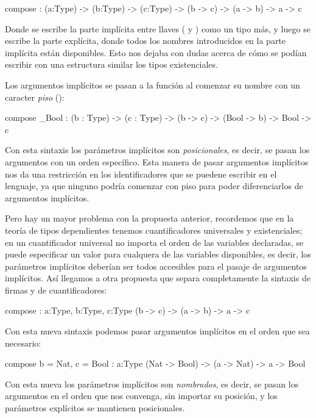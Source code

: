 {\begin{designfr}
\begin{anglercode}
compose : { (a:Type) -> (b:Type) -> (c:Type) } -> (b -> c) -> (a -> b) -> a -> c
\end{anglercode}

Donde se escribe la parte implícita entre llaves (\inlinecode{\{} y \inlinecode{\}}) como un tipo más, y luego se escribe la parte explícita, donde todos los nombres introducidos en la parte implícita están disponibles. Esto nos dejaba con dudas acerca de cómo se podían escribir con una estructura similar los tipos existenciales.

Los argumentos implícitos se pasan a la función al comenzar su nombre con un caracter \emph{piso} (\inlinecode{\_}):

\begin{anglercode}
compose _Bool : { (b : Type) -> (c : Type) } -> (b -> c) -> (Bool -> b) -> Bool -> c
\end{anglercode}

Con esta sintaxis los parámetros implícitos son \emph{posicionales}, es decir, se pasan los argumentos con un orden específico. Esta manera de pasar argumentos implícitos nos da una restricción en los identificadores que se puedene escribir en el lenguaje, ya que ninguno podría comenzar con piso para poder diferenciarlos de argumentos implícitos.

Pero hay un mayor problema con la propuesta anterior, recordemos que en la teoría de tipos dependientes tenemos cuantificadores universales y existenciales; en un cuantificador universal no importa el orden de las variables declaradas, se puede especificar un valor para cualquera de las variables disponibles, es decir, los parámetros implícitos deberían ser todos accesibles para el pasaje de argumentos implícitos. Así llegamos a otra propuesta que separa completamente la sintaxis de firmas y de cuantificadores:

\begin{anglercode}
compose : { a:Type, b:Type, c:Type } (b -> c) -> (a -> b) -> a -> c
\end{anglercode}

Con esta nueva sintaxis podemos pasar argumentos implícitos en el orden que sea necesario:

\begin{anglercode}
compose { b = Nat, c = Bool } : { a:Type } (Nat -> Bool) -> (a -> Nat) -> a -> Bool
\end{anglercode}

Con esta nueva los parámetros implícitos son \emph{nombrados}, es decir, se pasan los argumentos en el orden que nos convenga, sin importar su posición, y los parámetros explícitos se mantienen posicionales.


\end{designfr}}
